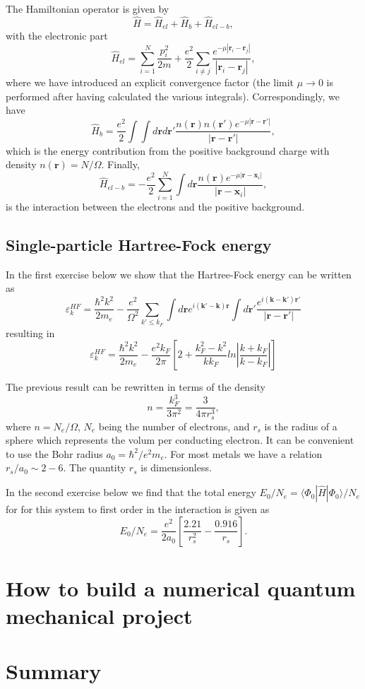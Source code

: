 The Hamiltonian operator is given by
\[
\hat{H}=\hat{H}_{el}+\hat{H}_{b}+\hat{H}_{el-b},
\]
with the electronic part
\[
\hat{H}_{el}=\sum_{i=1}^N\frac{p_i^2}{2m}+\frac{e^2}{2}\sum_{i\ne j}\frac{e^{-\mu |\mathbf{r}_i-\mathbf{r}_j|}}{|\mathbf{r}_i-\mathbf{r}_j|},
\]
where we have introduced an explicit convergence factor
(the limit $\mu\rightarrow 0$ is performed after having calculated the various integrals).
Correspondingly, we have
\[
\hat{H}_{b}=\frac{e^2}{2}\int\int d\mathbf{r}d\mathbf{r}'\frac{n(\mathbf{r})n(\mathbf{r}')e^{-\mu |\mathbf{r}-\mathbf{r}'|}}{|\mathbf{r}-\mathbf{r}'|},
\]
which is the energy contribution from the positive background charge with density
$n(\mathbf{r})=N/\Omega$. Finally,
\[
\hat{H}_{el-b}=-\frac{e^2}{2}\sum_{i=1}^N\int d\mathbf{r}\frac{n(\mathbf{r})e^{-\mu |\mathbf{r}-\mathbf{x}_i|}}{|\mathbf{r}-\mathbf{x}_i|},
\]
is the interaction between the electrons and the positive background.



\subsection{Single-particle Hartree-Fock energy}

In the first exercise below we show that the Hartree-Fock energy can be written as 
\[
\varepsilon_{k}^{HF}=\frac{\hbar^{2}k^{2}}{2m_e}-\frac{e^{2}}
{\Omega^{2}}\sum_{k'\leq
k_{F}}\int d\mathbf{r}e^{i(\mathbf{k}'-\mathbf{k})\mathbf{r}}\int
d\mathbf{r'}\frac{e^{i(\mathbf{k}-\mathbf{k}')\mathbf{r}'}}
{\vert\mathbf{r}-\mathbf{r}'\vert}
\]
resulting in
\[
\varepsilon_{k}^{HF}=\frac{\hbar^{2}k^{2}}{2m_e}-\frac{e^{2}
k_{F}}{2\pi}
\left[
2+\frac{k_{F}^{2}-k^{2}}{kk_{F}}ln\left\vert\frac{k+k_{F}}
{k-k_{F}}\right\vert
\right]
\]



The previous result can be rewritten in terms of the density
\[
n= \frac{k_F^3}{3\pi^2}=\frac{3}{4\pi r_s^3},
\]
where $n=N_e/\Omega$, $N_e$ being the number of electrons, and $r_s$ is the radius of a sphere which represents the volum per conducting electron.  
It can be convenient to use the Bohr radius $a_0=\hbar^2/e^2m_e$.
For most metals we have a relation $r_s/a_0\sim 2-6$.  The quantity $r_s$ is dimensionless.


In the second exercise below  we find that
the total energy
$E_0/N_e=\langle\Phi_{0}|\hat{H}|\Phi_{0}\rangle/N_e$ for
for this system to first order in the interaction is given as 
\[
E_0/N_e=\frac{e^2}{2a_0}\left[\frac{2.21}{r_s^2}-\frac{0.916}{r_s}\right].
\]












\section{How to build a numerical quantum mechanical project}


\section{Summary}
 
